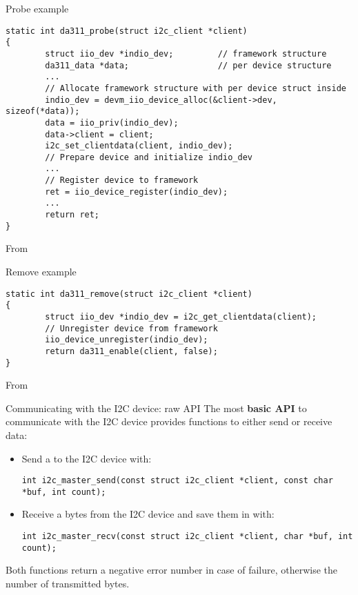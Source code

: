 \begin{frame}[fragile]{Probe example}
  \begin{block}{}
    \begin{verbatim}
static int da311_probe(struct i2c_client *client)
{
        struct iio_dev *indio_dev;         // framework structure
        da311_data *data;                  // per device structure
        ...
        // Allocate framework structure with per device struct inside
        indio_dev = devm_iio_device_alloc(&client->dev, sizeof(*data));
        data = iio_priv(indio_dev);
        data->client = client;
        i2c_set_clientdata(client, indio_dev);
        // Prepare device and initialize indio_dev
        ...
        // Register device to framework
        ret = iio_device_register(indio_dev);
        ...
        return ret;
}
    \end{verbatim}
  \end{block}
  From 
\end{frame}

\begin{frame}[fragile]{Remove example}
  \begin{block}{}
    \begin{verbatim}
static int da311_remove(struct i2c_client *client)
{
        struct iio_dev *indio_dev = i2c_get_clientdata(client);
        // Unregister device from framework
        iio_device_unregister(indio_dev);
        return da311_enable(client, false);
}
    \end{verbatim}
  \end{block}
  From 
\end{frame}

\begin{frame}[fragile]{Communicating with the I2C device: raw API}
  The most {\bf basic API} to communicate with the I2C device provides
  functions to either send or receive data:
  \begin{itemize}
  \item Send a  to the I2C device with:
    \begin{block}{}
      \begin{verbatim}
int i2c_master_send(const struct i2c_client *client, const char *buf, int count);
      \end{verbatim}
    \end{block}
  \item Receive a  bytes from the I2C device and save them in  with:
    \begin{block}{}
      \begin{verbatim}
int i2c_master_recv(const struct i2c_client *client, char *buf, int count);
      \end{verbatim}
    \end{block}
  \end{itemize}
  Both functions return a negative error number in case of failure, otherwise the
  number of transmitted bytes.
\end{frame}

